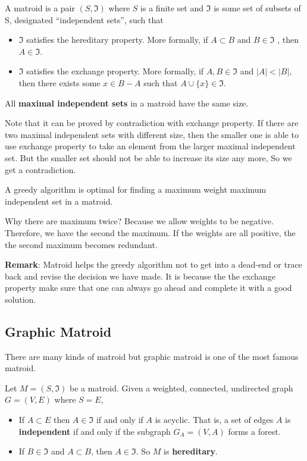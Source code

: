 \begin{definition}
A matroid is a pair $(S, \mathfrak{I})$ where $S$ is a finite set and $\mathfrak{I}$ is some set of subsets of S, designated ``independent sets'', such that
\begin{itemize}
	\item $\mathfrak{I}$ satisfies the hereditary property. More formally, if $A \subset B$ and $ B \in \mathfrak{I} $ , then $ A \in \mathfrak{I} $.
	\item $\mathfrak{I}$ satisfies the exchange property. More formally, if $A, B \in \mathfrak{I}$ and $|A| < |B|$, then there exists some $x \in B - A$ such that $A \cup \{x\}\in \mathfrak{I}$.
\end{itemize}
\end{definition}
All \textbf{maximal independent sets} in a matroid have the same size. 

Note that it can be proved by contradiction with exchange property. If there are two maximal independent sets with different size, then the smaller one is able to use exchange property to take an element from the larger maximal independent set. But the smaller set should not be able to increase its size any more, So we get a contradiction.

A greedy algorithm is optimal for finding a maximum weight maximum independent set in a matroid. 

Why there are maximum twice? Because we allow weights to be negative. Therefore, we have the second the maximum. If the weights are all positive, the the second maximum becomes redundant.

\textbf{Remark}: Matroid helps the greedy algorithm not to get into a dead-end or trace back and revise the decision we have made. It is because the the exchange property make sure that one can always go ahead and complete it with a good solution.  
\subsection{Graphic Matroid}
There are many kinds of matroid but graphic matroid is one of the most famous matroid.
\begin{definition}
	Let $ M = (S, \mathfrak{I}) $ be a matroid. Given a weighted, connected, undirected graph $ G = (V , E) $ where $ S = E $,
	\begin{itemize}
		\item If $ A \subset E $ then $A \in \mathfrak{I}$ if and only if $ A $ is acyclic. That is, a set of edges $A$ is \textbf{independent} if and only if the subgraph $G_A = (V, A)$ forms a forest.
		\item If $ B \in \mathfrak{I} $ and $ A \subset B $, then $ A \in \mathfrak{I} $. So $ M $ is \textbf{hereditary}.
	\end{itemize}
\end{definition}

